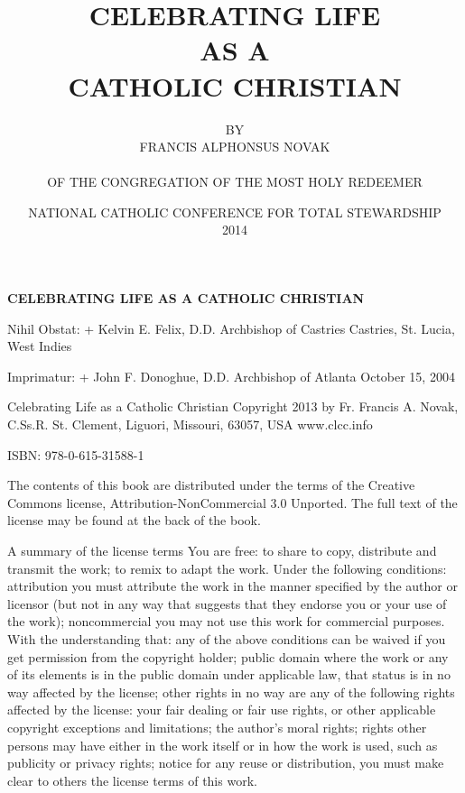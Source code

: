 \documentclass[oneside]{book}
\title{\textbf{CELEBRATING LIFE} \\ AS A \\ \textbf{CATHOLIC CHRISTIAN}}
\author{{\small BY} \\ FRANCIS ALPHONSUS NOVAK \\ \\ {\small OF THE CONGREGATION OF THE MOST HOLY REDEEMER}}
\date{\vfill {\small NATIONAL CATHOLIC CONFERENCE FOR TOTAL STEWARDSHIP \\ 2014} \clearpage}
\begin{document}
\pagestyle{plain}


\frontmatter

\setcounter{secnumdepth}{-1}
\section*{} 

\vspace*{\fill}
\begin{center}

{\large \textbf{CELEBRATING LIFE AS A CATHOLIC CHRISTIAN}}

\end{center}
\vspace*{\fill}
\pagebreak


Nihil Obstat: + Kelvin E. Felix, D.D.  Archbishop of Castries Castries,
St. Lucia, West Indies

Imprimatur: + John F. Donoghue, D.D.  Archbishop of Atlanta October 15, 2004

Celebrating Life as a Catholic Christian Copyright 2013 by Fr. Francis A. Novak,
C.Ss.R.  St. Clement, Liguori, Missouri, 63057, USA www.clcc.info

ISBN: 978-0-615-31588-1

The contents of this book are distributed under the terms of the Creative
Commons license, Attribution-NonCommercial 3.0 Unported. The full text of the
license may be found at the back of the book.

A summary of the license terms You are free: to share to copy, distribute and
transmit the work; to remix to adapt the work. Under the following conditions:
attribution you must attribute the work in the manner specified by the author or
licensor (but not in any way that suggests that they endorse you or your use of
the work); noncommercial you may not use this work for commercial purposes. With
the understanding that: any of the above conditions can be waived if you get
permission from the copyright holder; public domain where the work or any of its
elements is in the public domain under applicable law, that status is in no way
affected by the license; other rights in no way are any of the following rights
affected by the license: your fair dealing or fair use rights, or other
applicable copyright exceptions and limitations; the author's moral rights;
rights other persons may have either in the work itself or in how the work is
used, such as publicity or privacy rights; notice for any reuse or distribution,
you must make clear to others the license terms of this work.
\end{document}
